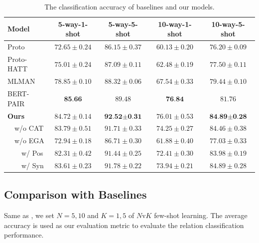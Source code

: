 \documentclass[11pt]{article}
\begin{document}
\begin{table}[t]
  \centering
   
  \begin{tabular}{l|cccc}
    \toprule
    \bf Model & \bf 5-way-1-shot & \bf 5-way-5-shot & \bf 10-way-1-shot & \bf 10-way-5-shot \\
    \midrule
    \midrule
    Proto \cite{Han2018FewRel} & $72.65\pm0.24$ & $86.15\pm0.37$ & $60.13\pm0.20$ & $76.20\pm0.09$ \\
    Proto-HATT \cite{gao2019hybrid} & $75.01\pm0.24$ & $87.09\pm0.11$ & $62.48\pm0.19$ & $77.50\pm0.11$ \\
    MLMAN \cite{YeMulti} & $78.85\pm0.10$ &$88.32\pm0.06$ &$67.54\pm0.33$ & $ 79.44\pm0.10$\\
    BERT-PAIR \cite{gao-etal-2019-fewrel} & $\textbf{85.66}$ &$89.48$ &$\textbf{76.84}$ & ${81.76}$\\
    \midrule
    \textbf{Ours} & ${84.72}\pm0.14$ & $\textbf{92.52}\pm\textbf{0.31}$ & ${76.01}\pm0.53$ & $\textbf{84.89}\pm\textbf{0.28}$ \\
     ~~w/o CAT &  $83.79\pm0.51$ & $91.71\pm0.33$ & $74.25\pm0.27$ & $84.46\pm0.38$ \\
     ~~w/o EGA &  $72.94\pm0.18$ & $86.71\pm0.30$ & $61.88\pm0.40$ & $77.03\pm0.33$ \\
     ~~~~w/ Pos &  $82.31\pm0.42$ & $91.44\pm0.25$ & $72.41\pm0.30$ & $83.98\pm0.19$ \\
     ~~~~w/ Syn &  $83.61\pm0.23$ & $91.78\pm0.22$ & $73.94\pm0.21$ & $84.89\pm0.28$ \\

    \bottomrule
  \end{tabular}
  \caption{The classification accuracy of baselines and our models.}
  \label{all}
  \vspace{-0.5cm}
\end{table}

\subsection{Comparison with Baselines}
Same as \cite{gao2019hybrid}, we set $N=5,10$ and $K=1,5$ of $N$v$K$ few-shot learning.
The average accuracy is used as our evaluation metric to evaluate the relation classification performance.
\end{document}
